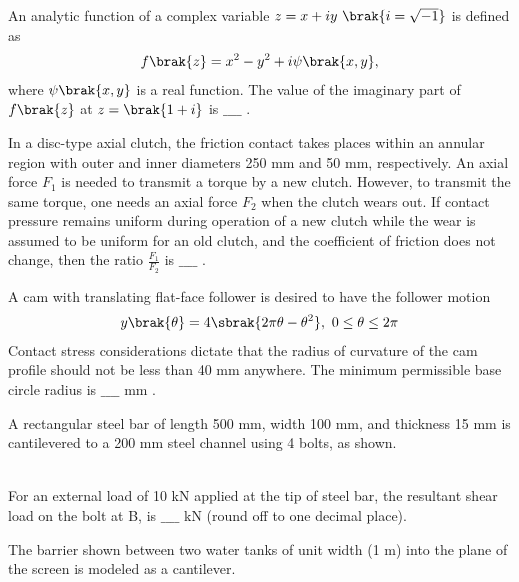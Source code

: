 \item An analytic function of a complex variable $z = x + iy\ \brak{i = \sqrt{-1}}$ is defined as 
\begin{align*}
    f\brak{z} = x^2 - y^2 + i\psi\brak{x,y},
\end{align*}
where $\psi\brak{x,y}$ is a real function. The value of the imaginary part of $f\brak{z}$ at $z = \brak{1 + i}$ is $\_\_\_\_$ . \\
\item In a disc-type axial clutch, the friction contact takes places within an annular region with outer and inner diameters 250 mm and 50 mm, respectively. An axial force $F_1$ is needed to transmit a torque by a new clutch. However, to transmit the same torque, one needs an axial force $F_2$ when the clutch wears out. If contact pressure remains uniform during operation of a new clutch while the wear is assumed to be uniform for an old clutch, and the coefficient of friction does not change, then the ratio $\frac{F_1}{F_2}$ is
$\_\_\_\_$ . \\
\item A cam with translating flat-face follower is desired to have the follower motion 
\begin{align*}
    y\brak{\theta} = 4 \sbrak{2\pi\theta - \theta^2},\ 0 \leq \theta \leq 2\pi
\end{align*}
Contact stress considerations dictate that the radius of curvature of the cam profile should not be less than 40 mm anywhere. The minimum permissible base circle radius is $\_\_\_\_$ mm . \\
\item A rectangular steel bar of length 500 mm, width 100 mm, and thickness 15 mm is cantilevered to a 200 mm steel channel using 4 bolts, as shown.
\begin{figure}[!ht]
\centering
\resizebox{0.7\textwidth}{!}{%

}%
\end{figure}\\
For an external load of 10 kN applied at the tip of steel bar, the resultant shear load on the bolt at B, is $\_\_\_\_$ kN (round off to one decimal place). \\
\item The barrier shown between two water tanks of unit width (1 m) into the plane of the screen is modeled as a cantilever.
\begin{figure}[!ht]
\centering
\resizebox{0.5\textwidth}{!}{%

}%
\end{figure}\\
